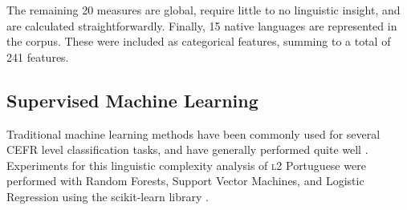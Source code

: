 The remaining 20 measures are global, require little to no linguistic insight, and are calculated straightforwardly. Finally, 15 native languages are represented in the corpus. These were included as categorical features, summing to a total of 241 features.

\begin{table}[b!]
\renewcommand{\arraystretch}{1.2}
    \centering
    \caption{Shallow complexity features and {\scshape l1}.}
    \label{tab:shallow}
\end{table}


\subsection{Supervised Machine Learning}

Traditional machine learning methods have been commonly used for several CEFR level classification tasks, and have generally performed quite well \citep{vajjala2014-estonian, pilan2016-swedish, vajjala2017-features, delrio2019a}. Experiments for this linguistic complexity analysis of {\scshape l2} Portuguese were performed with Random Forests, Support Vector Machines, and Logistic Regression using the scikit-learn library \citep{scikit-learn}.

